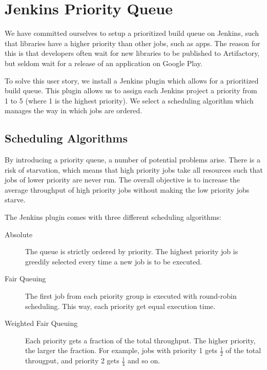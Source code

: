 \chapter{Jenkins Priority Queue}
We have committed ourselves to setup a prioritized build queue on Jenkins, such that libraries have a higher priority than other jobs, such as apps. The reason for this is that developers often wait for new libraries to be published to Artifactory, but seldom wait for a release of an application on Google Play. 

To solve this user story, we install a Jenkins plugin \parencite{jenkins-priority-plugin} which allows for a prioritized build queue. This plugin allows us to assign each Jenkins project a priority from 1 to 5 (where 1 is the highest priority). We select a scheduling algorithm which manages the way in which jobs are ordered.

\section{Scheduling Algorithms}
By introducing a priority queue, a number of potential problems arise. There is a risk of starvation, which means that high priority jobs take all resources such that jobs of lower priority are never run. The overall objective is to increase the average throughput of high priority jobs without making the low priority jobs starve.

The Jenkins plugin comes with three different scheduling algorithms:

\begin{description}
  \item[Absolute] The queue is strictly ordered by priority. The highest priority job is greedily selected every time a new job is to be executed.
  \item[Fair Queuing] The first job from each priority group is executed with round-robin scheduling. This way, each priority get equal execution time.
  \item[Weighted Fair Queuing] Each priority gets a fraction of the total throughput. The higher priority, the larger the fraction. For example, jobs with priority 1 gets $\frac{1}{2}$ of the total througput, and priority 2 gets $\frac{1}{4}$ and so on.
\end{description}

